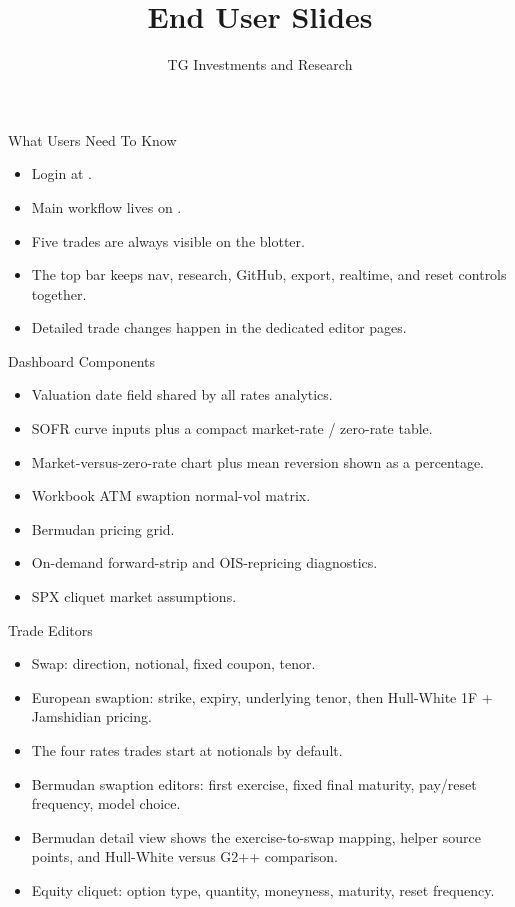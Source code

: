 \documentclass[aspectratio=169]{beamer}
\title{End User Slides}
\subtitle{\product}
\author{TG Investments and Research}
\date{\docdate}
\begin{document}
\frame{\titlepage}

\begin{frame}{What Users Need To Know}
\begin{itemize}
    \item Login at .
    \item Main workflow lives on .
    \item Five trades are always visible on the blotter.
    \item The top bar keeps nav, research, GitHub, export, realtime, and reset controls together.
    \item Detailed trade changes happen in the dedicated editor pages.
\end{itemize}
\end{frame}

\begin{frame}{Dashboard Components}
\begin{itemize}
    \item Valuation date field shared by all rates analytics.
    \item SOFR curve inputs plus a compact market-rate / zero-rate table.
    \item Market-versus-zero-rate chart plus mean reversion shown as a percentage.
    \item Workbook ATM swaption normal-vol matrix.
    \item Bermudan pricing grid.
    \item On-demand forward-strip and OIS-repricing diagnostics.
    \item SPX cliquet market assumptions.
\end{itemize}
\end{frame}

\begin{frame}{Trade Editors}
\begin{itemize}
    \item Swap: direction, notional, fixed coupon, tenor.
    \item European swaption: strike, expiry, underlying tenor, then Hull-White 1F + Jamshidian pricing.
    \item The four rates trades start at  notionals by default.
    \item Bermudan swaption editors: first exercise, fixed final maturity, pay/reset frequency, model choice.
    \item Bermudan detail view shows the exercise-to-swap mapping, helper source points, and Hull-White versus G2++ comparison.
    \item Equity cliquet: option type, quantity, moneyness, maturity, reset frequency.
\end{itemize}
\end{frame}
\end{document}
